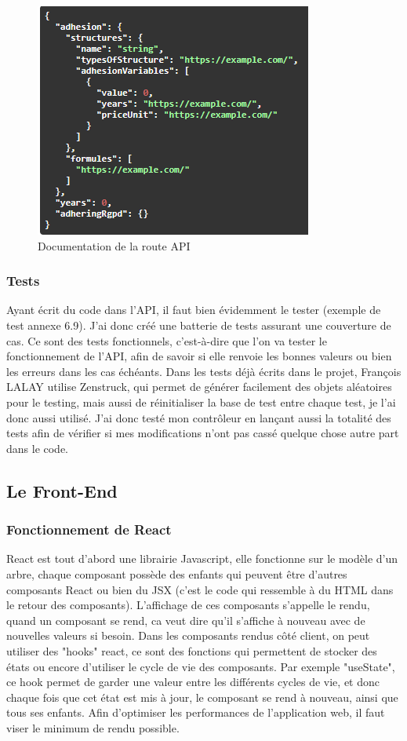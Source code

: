\documentclass[a4paper,12pt]{report}
\begin{document}
\begin{figure}[ht]
    \centering
    \includegraphics[scale=0.8]{docSimulatorInput.png}
    \caption{Documentation de la route API}
    \label{fig:swagger-simulator-in}
\end{figure}


\subsubsection{Tests}
Ayant écrit du code dans l'API, il faut bien évidemment le tester (exemple de test annexe 6.9). J'ai donc créé une batterie de tests assurant une couverture de cas. Ce sont des tests fonctionnels, c'est-à-dire que l'on va tester le fonctionnement de l'API, afin de savoir si elle renvoie les bonnes valeurs ou bien les erreurs dans les cas échéants. Dans les tests déjà écrits dans le projet, François LALAY utilise Zenstruck, qui permet de générer facilement des objets aléatoires pour le testing, mais aussi de réinitialiser la base de test entre chaque test, je l'ai donc aussi utilisé. J'ai donc testé mon contrôleur en lançant aussi la totalité des tests afin de vérifier si mes modifications n'ont pas cassé quelque chose autre part dans le code.

\subsection{Le Front-End}

\subsubsection{Fonctionnement de React}
React est tout d'abord une librairie Javascript, elle fonctionne sur le modèle d'un arbre, chaque composant possède des enfants qui peuvent être d'autres composants React ou bien du JSX (c'est le code qui ressemble à du HTML dans le retour des composants). L'affichage de ces composants s'appelle le rendu, quand un composant se rend, ca veut dire qu'il s'affiche à nouveau avec de nouvelles valeurs si besoin. Dans les composants rendus côté client, on peut utiliser des "hooks" react, ce sont des fonctions qui permettent de stocker des états ou encore d'utiliser le cycle de vie des composants. Par exemple "useState", ce hook permet de garder une valeur entre les différents cycles de vie, et donc chaque fois que cet état est mis à jour, le composant se rend à nouveau, ainsi que tous ses enfants. Afin d'optimiser les performances de l'application web, il faut viser le minimum de rendu possible.
\end{document}
